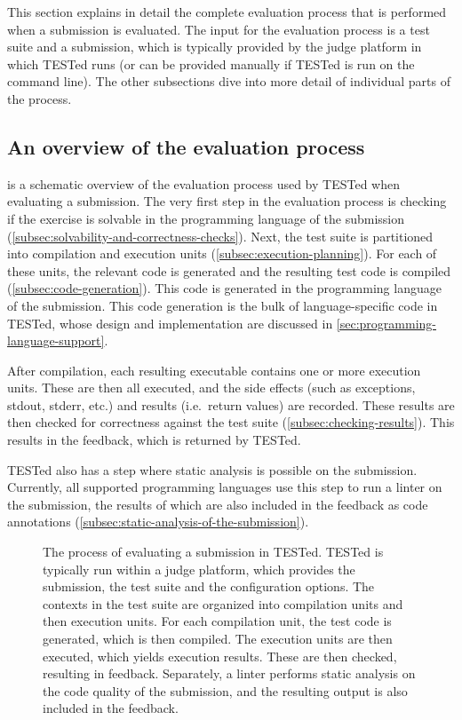 \documentclass[../main]{subfiles}
\begin{document}
This section explains in detail the complete evaluation process that is performed when a submission is evaluated.
The input for the evaluation process is a test suite and a submission, which is typically provided by the judge platform in which TESTed runs (or can be provided manually if TESTed is run on the command line).
The other subsections dive into more detail of individual parts of the process.

\subsection{An overview of the evaluation process}\label{subsec:evaluation-process}

 is a schematic overview of the evaluation process used by TESTed when evaluating a submission.
The very first step in the evaluation process is checking if the exercise is solvable in the programming language of the submission (\cref{subsec:solvability-and-correctness-checks}).
Next, the test suite is partitioned into compilation and execution units (\cref{subsec:execution-planning}).
For each of these units, the relevant code is generated and the resulting test code is compiled (\cref{subsec:code-generation}).
This code is generated in the programming language of the submission.
This code generation is the bulk of language-specific code in TESTed, whose design and implementation are discussed in \cref{sec:programming-language-support}.

After compilation, each resulting executable contains one or more execution units.
These are then all executed, and the side effects (such as exceptions, stdout, stderr, etc.) and results (i.e.\ return values) are recorded.
These results are then checked for correctness against the test suite (\cref{subsec:checking-results}).
This results in the feedback, which is returned by TESTed.

TESTed also has a step where static analysis is possible on the submission.
Currently, all supported programming languages use this step to run a linter on the submission, the results of which are also included in the feedback as code annotations (\cref{subsec:static-analysis-of-the-submission}).

\begin{figure}
    \centering
    
    \caption{
        The process of evaluating a submission in TESTed.
        TESTed is typically run within a judge platform, which provides the submission, the test suite and the configuration options.
        The contexts in the test suite are organized into compilation units and then execution units.
        For each compilation unit, the test code is generated, which is then compiled.
        The execution units are then executed, which yields execution results. These are then checked, resulting in feedback.
        Separately, a linter performs static analysis on the code quality of the submission, and the resulting output is also included in the feedback.
    }
    \label{fig:flow}
\end{figure}
\end{document}
